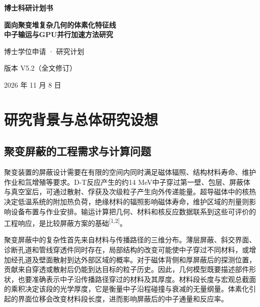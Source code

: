 \documentclass[UTF8, zihao=-4, fontset=none, a4paper]{ctexart}
\newcommand{\upcite}[1]{\textsuperscript{[#1]}}
\begin{document}
\begin{titlepage}
  \centering
  \vspace*{2.4cm}
  {\bfseries 博士科研计划书\par}
  \vspace{1.6cm}
  {\bfseries 面向聚变堆复杂几何的体素化特征线\\[0.6ex]
   中子输运与GPU并行加速方法研究\par}
  \vspace{2.4cm}
  { 博士学位申请 · 研究计划\par}
  \vspace{6cm}
  { 版本 V5.2（全文修订）\par}
  \vspace{0.6ex}
  { 2026 年 11 月 8 日\par}
  \vfill
\end{titlepage}

\begingroup
\linespread{1.05}\selectfont
\setlength{\parskip}{0pt}
\tableofcontents
\endgroup
\clearpage

\setcounter{page}{1}




\section{研究背景与总体研究设想}\label{sec:1}

\subsection{聚变屏蔽的工程需求与计算问题}

聚变装置的屏蔽设计需要在有限的空间内同时满足磁体辐照、结构材料寿命、维护作业和氚增殖等要求。D-T反应产生的约14 MeV中子穿过第一壁、包层、屏蔽体与真空室后，可通过散射、俘获及次级粒子产生向外传递能量。超导磁体中的核热决定低温系统的附加热负荷，绝缘材料的辐照影响磁体寿命，维护区域的剂量则影响设备布置与作业安排。输运计算把几何、材料和核反应数据联系到这些可评价的工程响应，是比较屏蔽方案的基础\upcite{1,2}。

聚变屏蔽中的复杂性首先来自材料与传播路径的三维分布。薄层屏蔽、斜交界面、诊断孔道和管线穿透件同时存在，局部结构的改变可能使中子穿过不同材料，或增加经孔道及壁面散射到达外部区域的概率。对于磁体背侧和厚屏蔽后的探测位置，贡献来自穿透或散射后仍能到达目标的粒子历史。因此，几何模型既要描述部件形状，也要准确表示中子沿传播路径穿过的材料及其厚度。材料段长度与宏观总截面的乘积决定该段的光学厚度，它是衡量中子沿程碰撞与衰减的无量纲量。体素化引起的界面位移会改变材料段长度，进而影响屏蔽后的中子通量和反应率。
\end{document}
